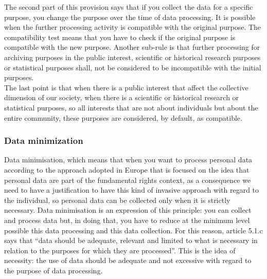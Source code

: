 The second part of this provision says that if you collect the data for a specific purpose, you change the purpose over the time of data processing. It is possible when the further processing activity is compatible with the original purpose. The compatibility test means that you have to check if the original purpose is compatible with the new purpose. Another sub-rule is that further processing for archiving purposes in the public interest, scientific or historical research purposes or statistical purposes shall, not be considered to be incompatible with the initial purposes.\\

The last point is that when there is a public interest that affect the collective dimension of our society, when there is a scientific or historical research or statistical purposes, so all interests that are not about individuals but about the entire community, these purposes are considered, by default, as compatible.

\subsubsection{Data minimization}
Data minimisation, which means that when you want to process personal data according to the approach adopted in Europe that is focused on the idea that personal data are part of the fundamental rights context, as a consequence we need to have a justification to have this kind of invasive approach with regard to the individual, so personal data can be collected only when it is strictly necessary. Data minimisation is an expression of this principle: you can collect and process data but, in doing that, you have to reduce at the minimum level possible this data processing and this data collection. For this reason, article 5.1.c says that “data should be adequate, relevant and limited to what is necessary in relation to the purposes for which they are processed”. This is the idea of necessity: the use of data should be adequate and not excessive with regard to the purpose of data processing.

